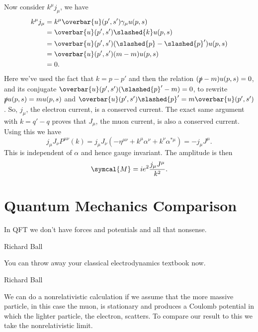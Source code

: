 \documentclass[fleqn]{NotesClass}
\newcommand{\minkowskiMetric}{\eta}
\newcommand{\amplitude}{\symcal{M}}
\newcommand{\diracadjoint}[1]{\overbar{#1}}
\begin{document}
    Now consider \(k^\mu j_\mu\), we have
    \begin{align}
        k^\mu j_\mu &= k^\mu \diracadjoint{u}(p', s') \gamma_\mu u(p, s)\\
        &= \diracadjoint{u}(p', s') \slashed{k} u(p, s)\\
        &= \diracadjoint{u}(p', s')(\slashed{p} - \slashed{p}') u(p, s)\\
        &= \diracadjoint{u}(p', s')(m - m)u(p, s)\\
        &= 0.
    \end{align}
    Here we've used the fact that \(k = p - p'\) and then the relation \((\slashed{p} - m)u(p, s) = 0\), and its conjugate \(\diracadjoint{u}(p', s')(\slashed{p}' - m) = 0\), to rewrite \(\slashed{p}u(p, s) = mu(p, s)\) and \(\diracadjoint{u}(p', s')\slashed{p}' = m\diracadjoint{u}(p', s')\).
    So, \(j_\mu\), the electron current, is a conserved current.
    The exact same argument with \(k = q' - q\) proves that \(J_\mu\), the muon current, is also a conserved current.
    Using this we have
    \begin{equation}
        j_\mu J_\nu P^{\mu\nu}(k) = j_\mu J_\nu (-\minkowskiMetric^{\mu\nu} + k^\mu \alpha^\nu + k^\nu \alpha^{*\mu}) = -j_\mu J^\mu.
    \end{equation}
    This is independent of \(\alpha\) and hence gauge invariant.
    The amplitude is then
    \begin{equation}
        \amplitude = ie^2 \frac{j_\mu J^\mu}{k^2}.
    \end{equation}
    
    \section{Quantum Mechanics Comparison}
    \epigraph{In QFT we don't have forces and potentials and all that nonsense.}{Richard Ball}
    \epigraph{You can throw away your classical electrodynamics textbook now.}{Richard Ball}
    We can do a nonrelativistic calculation if we assume that the more massive particle, in this case the muon, is stationary and produces a Coulomb potential in which the lighter particle, the electron, scatters.
    To compare our result to this we take the nonrelativistic limit.
    
\end{document}
